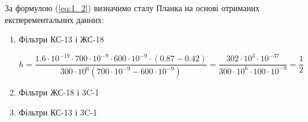 \documentclass[twocolumn]{el-author}
\begin{document}
За формулою (\ref{eq:1_2}) визначимо сталу Планка на основі отриманих експерементальних данних:

\begin{enumerate}
	\item Фільтри КС-13 і ЖС-18

		\begin{equation} \label{eq:4}
			h = \frac{
				1.6 \cdot 10^{-19} \cdot 
				700 \cdot 10^{-9} \cdot 
				600 \cdot 10^{-9} \cdot 
				(0.87 - 0.42)
			}{
				300 \cdot 10^{6}(700 \cdot 10^{-9} - 600 \cdot 10^{-9})
			} 
			=
			\frac{302 \cdot 10^{3} \cdot 10^{-37}}
				{300 \cdot 10^{6} \cdot 100 \cdot 10^{-9}}
			=
			\frac{1}{2}
		\end{equation}	
	
	\item Фільтри ЖС-18 і 3C-1
	\item Фільтри КС-13 і 3C-1
\end{enumerate}
\end{document}
